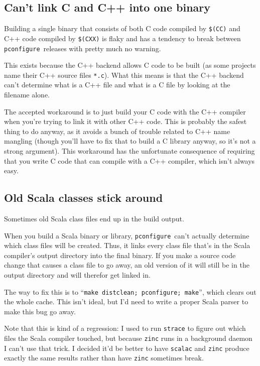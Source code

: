 \documentclass{article}
\newcommand{\pconfigure}{\texttt{pconfigure}}
\begin{document}
\subsection{Can't link C and C++ into one binary}

Building a single binary that consists of both C code compiled by
\texttt{\$(CC)} and C++ code compiled by \texttt{\$(CXX)} is flaky and
has a tendency to break between \pconfigure\ releases with pretty much
no warning.

This exists because the C++ backend allows C code to be built (as some
projects name their C++ source files \texttt{*.c}).  What this means
is that the C++ backend can't determine what is a C++ file and what is
a C file by looking at the filename alone.

The accepted workaround is to just build your C code with the C++
compiler when you're trying to link it with other C++ code.  This is
probably the safest thing to do anyway, as it avoids a bunch of
trouble related to C++ name mangling (though you'll have to fix that
to build a C library anyway, so it's not a strong argument).  This
workaround has the unfortunate consequence of requiring that you write
C code that can compile with a C++ compiler, which isn't always easy.

\subsection{Old Scala classes stick around}

Sometimes old Scala class files end up in the build output.

When you build a Scala binary or library, \pconfigure\ can't actually
determine which class files will be created.  Thus, it links every
class file that's in the Scala compiler's output directory into the
final binary.  If you make a source code change that causes a class
file to go away, an old version of it will still be in the output
directory and will therefor get linked in.

The way to fix this is to ``\texttt{make distclean; pconfigure;
  make}'', which clears out the whole cache.  This isn't ideal, but
I'd need to write a proper Scala parser to make this bug go away.

Note that this is kind of a regression: I used to run \texttt{strace}
to figure out which files the Scala compiler touched, but because
\texttt{zinc} runs in a background daemon I can't use that trick.  I
decided it'd be better to have \texttt{scalac} and \texttt{zinc}
produce exactly the same results rather than have \texttt{zinc}
sometimes break.
\end{document}
